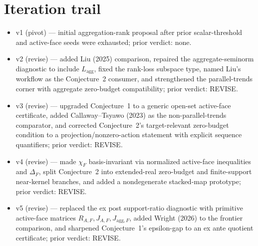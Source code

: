 \documentclass[11pt]{article}
\theoremstyle{definition}
\theoremstyle{plain}
\theoremstyle{remark}
\begin{document}
\section{Iteration trail}
\begin{itemize}
\item v1 (pivot) --- initial aggregation-rank proposal after prior scalar-threshold and active-face seeds were exhausted; prior verdict: none.
\item v2 (revise) --- added Liu (2025) comparison, repaired the aggregate-seminorm diagnostic to include \(L_{\mathrm{agg}}\), fixed the rank-loss subspace type, named Liu's workflow as the Conjecture~2 consumer, and strengthened the parallel-trends corner with aggregate zero-budget compatibility; prior verdict: REVISE.
\item v3 (revise) --- upgraded Conjecture~1 to a generic open-set active-face certificate, added Callaway--Tsyawo (2023) as the non-parallel-trends comparator, and corrected Conjecture~2's target-relevant zero-budget condition to a projection/nonzero-action statement with explicit sequence quantifiers; prior verdict: REVISE.
\item v4 (revise) --- made \(\chi_F\) basis-invariant via normalized active-face inequalities and \(\Delta_F\), split Conjecture~2 into extended-real zero-budget and finite-support near-kernel branches, and added a nondegenerate stacked-map prototype; prior verdict: REVISE.
\item v5 (revise) --- replaced the ex post support-ratio diagnostic with primitive active-face matrices \(R_{A,F},J_{A,F},J_{\mathrm{agg},F}\), added Wright (2026) to the frontier comparison, and sharpened Conjecture~1's epsilon-gap to an ex ante quotient certificate; prior verdict: REVISE.
\end{itemize}
\end{document}
